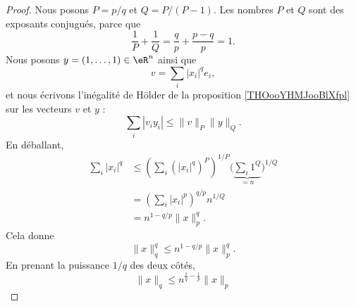 \begin{proof}
	Nous posons \( P=p/q\) et \( Q=P/(P-1)\). Les nombres \( P\) et \( Q\) sont des exposants conjugués, parce que
	\begin{equation}
		\frac{1}{ P }+\frac{1}{ Q }=\frac{ q }{ p }+\frac{ p-q }{ p }=1.
	\end{equation}
	Nous posons \( y=(1,\ldots, 1)\in \eR^n\) ainsi que
	\begin{equation}
		v=\sum_i| x_i |^qe_i,
	\end{equation}
	et nous écrivons l'inégalité de Hölder de la proposition \ref{THOooYHMJooBlXfpl} sur les vecteurs \( v\) et \( y\) :
	\begin{equation}
		\sum_i| v_iy_i |\leq \| v \|_P\| y \|_Q.
	\end{equation}
	En déballant,
	\begin{subequations}
		\begin{align}
			\sum_i| x_i |^q & \leq  \left( \sum_i(| x_i |^q)^P \right)^{1/P}\big( \underbrace{\sum_i1^Q}_{=n} \big)^{1/Q} \\
			                & =   \left( \sum_i | x_i |^p \right)^{q/p}n^{1/Q}                                            \\
			                & =   n^{1-q/p}\| x \|_p^q.
		\end{align}
	\end{subequations}
	Cela donne
	\begin{equation}
		\| x \|_q^q\leq n^{1-q/p}\| x \|_p^q.
	\end{equation}
	En prenant la puissance \( 1/q\) des deux côtés,
	\begin{equation}
		\| x \|_q\leq   n^{\frac{1}{ q }-\frac{1}{ p }}   \| x \|_p
	\end{equation}
\end{proof}
